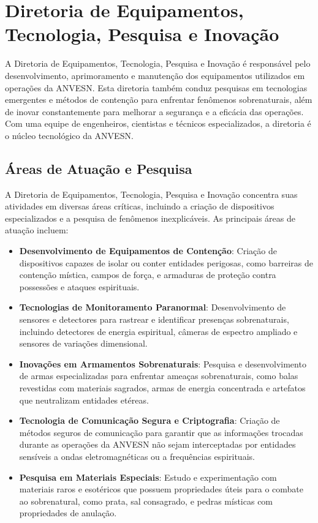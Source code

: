 \chapter{Diretoria de Equipamentos, Tecnologia, Pesquisa e Inovação}

A Diretoria de Equipamentos, Tecnologia, Pesquisa e Inovação é responsável pelo desenvolvimento, aprimoramento e manutenção dos equipamentos utilizados em operações da ANVESN. Esta diretoria também conduz pesquisas em tecnologias emergentes e métodos de contenção para enfrentar fenômenos sobrenaturais, além de inovar constantemente para melhorar a segurança e a eficácia das operações. Com uma equipe de engenheiros, cientistas e técnicos especializados, a diretoria é o núcleo tecnológico da ANVESN.

\section{Áreas de Atuação e Pesquisa}
A Diretoria de Equipamentos, Tecnologia, Pesquisa e Inovação concentra suas atividades em diversas áreas críticas, incluindo a criação de dispositivos especializados e a pesquisa de fenômenos inexplicáveis. As principais áreas de atuação incluem:

\begin{itemize}
    \item \textbf{Desenvolvimento de Equipamentos de Contenção}: Criação de dispositivos capazes de isolar ou conter entidades perigosas, como barreiras de contenção mística, campos de força, e armaduras de proteção contra possessões e ataques espirituais.
    \item \textbf{Tecnologias de Monitoramento Paranormal}: Desenvolvimento de sensores e detectores para rastrear e identificar presenças sobrenaturais, incluindo detectores de energia espiritual, câmeras de espectro ampliado e sensores de variações dimensional.
    \item \textbf{Inovações em Armamentos Sobrenaturais}: Pesquisa e desenvolvimento de armas especializadas para enfrentar ameaças sobrenaturais, como balas revestidas com materiais sagrados, armas de energia concentrada e artefatos que neutralizam entidades etéreas.
    \item \textbf{Tecnologia de Comunicação Segura e Criptografia}: Criação de métodos seguros de comunicação para garantir que as informações trocadas durante as operações da ANVESN não sejam interceptadas por entidades sensíveis a ondas eletromagnéticas ou a frequências espirituais.
    \item \textbf{Pesquisa em Materiais Especiais}: Estudo e experimentação com materiais raros e esotéricos que possuem propriedades úteis para o combate ao sobrenatural, como prata, sal consagrado, e pedras místicas com propriedades de anulação.
\end{itemize}

